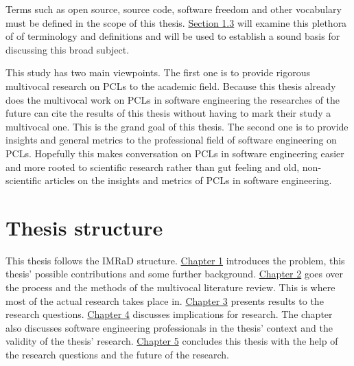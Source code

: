 Terms such as open source, source code, software freedom and other vocabulary must be defined in the scope of this thesis. \hyperref[sec:bg]{Section 1.3} will examine this plethora of of terminology and definitions and will be used to establish a sound basis for discussing this broad subject.

This study has two main viewpoints. The first one is to provide rigorous multivocal research on PCLs to the academic field. Because this thesis already does the multivocal work on PCLs in software engineering the researches of the future can cite the results of this thesis without having to mark their study a multivocal one. This is the grand goal of this thesis. The second one is to provide insights and general metrics to the professional field of software engineering on PCLs. Hopefully this makes conversation on PCLs in software engineering easier and more rooted to scientific research rather than gut feeling and old, non-scientific articles on the insights and metrics of PCLs in software engineering.

\section{Thesis structure}
This thesis follows the IMRaD structure. \hyperref[intro]{Chapter 1} introduces the problem, this thesis' possible contributions and some further background. \hyperref[methods]{Chapter 2} goes over the process and the methods of the multivocal literature review. This is where most of the actual research takes place in. \hyperref[results]{Chapter 3} presents results to the research questions. \hyperref[discussion]{Chapter 4} discusses implications for research. The chapter also discusses software engineering professionals in the thesis' context and the validity of the thesis' research. \hyperref[conclusions]{Chapter 5} concludes this thesis with the help of the research questions and the future of the research.

